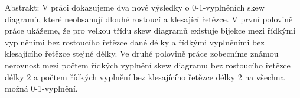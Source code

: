 \documentclass[12pt]{article}
\begin{document}
Abstrakt: V práci dokazujeme dva nové výsledky o 0-1-vyplněních skew diagramů,
které neobsahují dlouhé rostoucí a klesající řetězce. V první polovině práce
ukážeme, že pro velkou třídu skew diagramů existuje bijekce mezi řídkými vyplněními
bez rostoucího řetězce dané délky a řídkými vyplněními bez klesajícího řetězce stejné délky.
Ve druhé polovině práce zobecníme známou nerovnost mezi počtem řídkých vyplnění skew diagramu
bez rostoucího řetězce délky 2 a počtem řídkých vyplnění bez klesajícího řetězce délky 2
na všechna možná 0-1-vyplnění.
\end{document}
